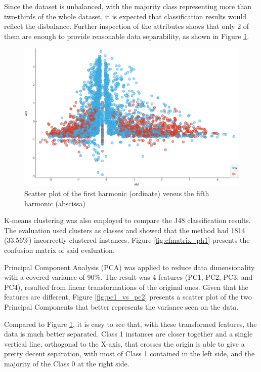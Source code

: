 \documentclass{article}
\begin{document}
Since the dataset is unbalanced, with the majority class representing more than two-thirds of the whole dataset, it is expected that classification results would reflect the disbalance. Further inspection of the attributes shows that only 2 of them are enough to provide reasonable data separability, as shown in Figure \ref{fig:ah1_vs_ah5}.

\begin{figure}[htbp]
    \centering
    \includegraphics[scale=0.4]{ah1vsah5.png}
    \caption{Scatter plot of the first harmonic (ordinate) versus the fifth harmonic (abscissa)}
    \label{fig:ah1_vs_ah5}
\end{figure}

K-means clustering was also employed to compare the J48 classification results. The evaluation used clusters as classes and showed that the method had 1814 (33.56\%) incorrectly clustered instances. Figure \ref{fig:cfmatrix_ph1} presents the confusion matrix of said evaluation.

Principal Component Analysis (PCA) was applied to reduce data dimensionality with a covered variance of 90\%. The result was 4 features (PC1, PC2, PC3, and PC4), resulted from linear transformations of the original ones. Given that the features are different, Figure \ref{fig:pc1_vs_pc2} presents a scatter plot of the two Principal Components that better represents the variance seen on the data.

Compared to Figure \ref{fig:ah1_vs_ah5}, it is easy to see that, with these transformed features, the data is much better separated. Class 1 instances are closer together and a single vertical line, orthogonal to the X-axis, that crosses the origin is able to give a pretty decent separation, with most of Class 1 contained in the left side, and the majority of the Class 0 at the right side.
\end{document}
